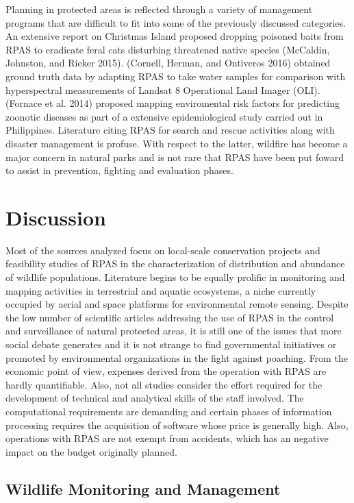 \documentclass[]{interact}
\theoremstyle{plain}%
\theoremstyle{definition}
\theoremstyle{remark}
\begin{document}
Planning in protected areas is reflected through a variety of management
programs that are difficult to fit into some of the previously discussed
categories. An extensive report on Christmas Island proposed dropping
poisoned baits from RPAS to eradicate feral cats disturbing threatened
native species (McCaldin, Johnston, and Rieker 2015). (Cornell, Herman,
and Ontiveros 2016) obtained ground truth data by adapting RPAS to take
water samples for comparison with hyperspectral measurements of Landsat
8 Operational Land Imager (OLI). (Fornace et al. 2014) proposed mapping
enviromental risk factors for predicting zoonotic diseases as part of a
extensive epidemiological study carried out in Philippines. Literature
citing RPAS for search and rescue activities along with disaster
management is profuse. With respect to the latter, wildfire has become a
major concern in natural parks and is not rare that RPAS have been put
foward to assist in prevention, fighting and evaluation phases.

\section{Discussion}\label{discussion}

Most of the sources analyzed focus on local-scale conservation projects
and feasibility studies of RPAS in the characterization of distribution
and abundance of wildlife populations. Literature begins to be equally
prolific in monitoring and mapping activities in terrestrial and aquatic
ecosystems, a niche currently occupied by aerial and space platforms for
environmental remote sensing. Despite the low number of scientific
articles addressing the use of RPAS in the control and surveillance of
natural protected areas, it is still one of the issues that more social
debate generates and it is not strange to find governmental initiatives
or promoted by environmental organizations in the fight against
poaching. From the economic point of view, expenses derived from the
operation with RPAS are hardly quantifiable. Also, not all studies
consider the effort required for the development of technical and
analytical skills of the staff involved. The computational requirements
are demanding and certain phases of information processing requires the
acquisition of software whose price is generally high. Also, operations
with RPAS are not exempt from accidents, which has an negative impact on
the budget originally planned.

\subsection{Wildlife Monitoring and
Management}\label{wildlife-monitoring-and-management-1}
\end{document}

